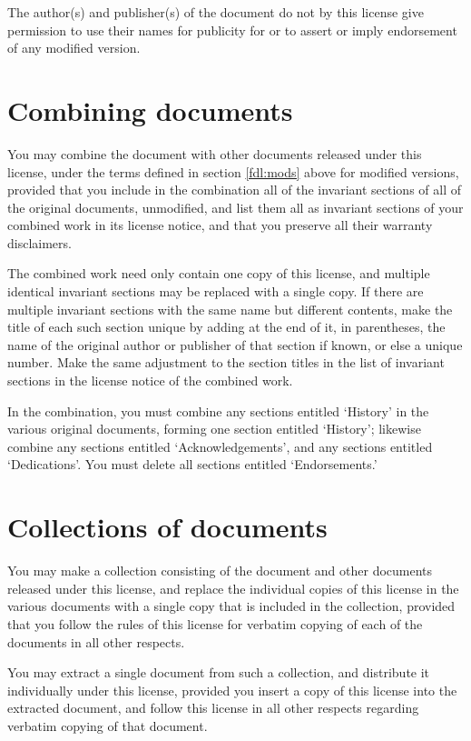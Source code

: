 \begin{multicols}{3}
The author(s) and publisher(s) of the document do not by this license give permission to use their names for publicity for or to assert or imply endorsement of any modified version.

\section{Combining documents}
\label{fdl:combine}

You may combine the document with other documents released under this license, under the terms defined in section \ref{fdl:mods} above for modified versions, provided that you include in the combination all of the invariant sections of all of the original documents, unmodified, and list them all as invariant sections of your combined work in its license notice, and that you preserve all their warranty disclaimers.

The combined work need only contain one copy of this license, and multiple identical invariant sections may be replaced with a single copy. If there are multiple invariant sections with the same name but different contents, make the title of each such section unique by adding at the end of it, in parentheses, the name of the original author or publisher of that section if known, or else a unique number. Make the same adjustment to the section titles in the list of invariant sections in the license notice of the combined work.

In the combination, you must combine any sections entitled \enquote*{History} in the various original documents, forming one section entitled \enquote*{History}; likewise combine any sections entitled \enquote*{Acknowledgements}, and any sections entitled \enquote*{Dedications}. You must delete all sections entitled \enquote*{Endorsements.}

\section{Collections of documents}
\label{fdl:collect}

You may make a collection consisting of the document and other documents released under this license, and replace the individual copies of this license in the various documents with a single copy that is included in the collection, provided that you follow the rules of this license for verbatim copying of each of the documents in all other respects.

You may extract a single document from such a collection, and distribute it individually under this license, provided you insert a copy of this license into the extracted document, and follow this license in all other respects regarding verbatim copying of that document.


\end{multicols}

